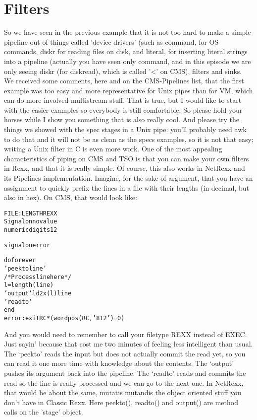 \chapter{Filters}
So we have seen in the previous example that it is not too hard to make a simple pipeline out of things called 'device drivers' (such as command, for OS commands, diskr for reading files on disk, and literal, for inserting literal strings into a pipeline (actually you have seen only command, and in this episode we are only seeing diskr (for diskread), which is called '<' on CMS), filters and sinks.
We received some comments, here and on the CMS-Pipelines list, that the first example was too easy and more representative for Unix pipes than for VM, which can do more involved multistream stuff. That is true, but I would like to start with the easier examples so everybody is still comfortable. So please hold your horses while I show you something that is also really cool. And please try the things we showed with the spec stages in a Unix pipe: you'll probably need awk to do that and it will not be as clean as the specs examples, so it is not that easy; writing a Unix filter in C is even more work.
One of the most appealing characteristics of piping on CMS and TSO is
that you can make your own filters in Rexx, and that it is really
simple. Of course, this also works in NetRexx and its Pipelines
implementation. Imagine, for the sake of argument, that you have an
assignment to quickly prefix the lines in a file with their lengths
(in decimal, but also in hex). On CMS, that would look like:
\begin{alltt}
FILE: LENGTH REXX
Signal on novalue
numeric digits 12

signal on error

do forever
'peekto line'
/* Process line here */
l=length(line)
'output' l d2x(l) line
'readto'
end
error: exit RC*(wordpos(RC, '8 12')=0)
\end{alltt}
And you would need to remember to call your filetype REXX instead of EXEC. Just sayin’ because that cost me two minutes of feeling less intelligent than usual. The ‘peekto’ reads the input but does not actually commit the read yet, so you can read it one more time with knowledge about the contents. The ‘output’ pushes its argument back into the pipeline. The ‘readto’ reads and commits the read so the line is really processed and we can go to the next one.
In NetRexx, that would be about the same, mutatis mutandis the object oriented stuff you don't have in Classic Rexx. Here peekto(), readto() and output() are method calls on the ’stage’ object.
